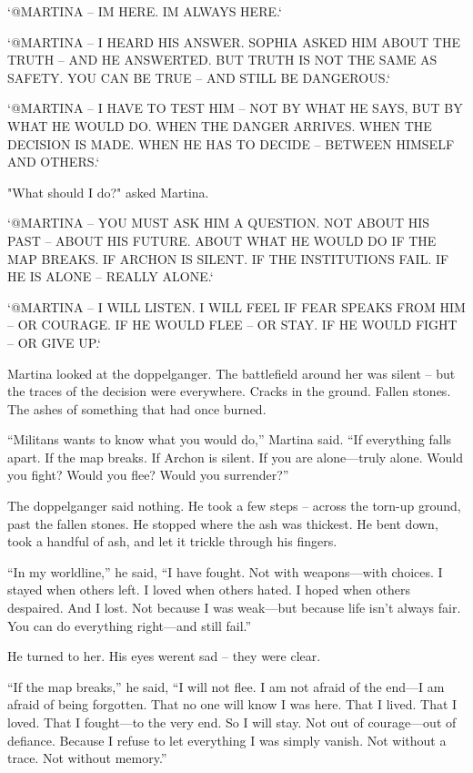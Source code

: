 \documentclass[
]{article}
\begin{document}
`@MARTINA -- I\textquotesingle M HERE. I\textquotesingle M ALWAYS HERE.`

`@MARTINA -- I HEARD HIS ANSWER. SOPHIA ASKED HIM ABOUT THE TRUTH -- AND HE ANSWERTED. BUT TRUTH IS NOT THE SAME AS SAFETY. YOU CAN BE TRUE -- AND STILL BE DANGEROUS.`

`@MARTINA -- I HAVE TO TEST HIM -- NOT BY WHAT HE SAYS, BUT BY WHAT HE WOULD DO. WHEN THE DANGER ARRIVES. WHEN THE DECISION IS MADE. WHEN HE HAS TO DECIDE -- BETWEEN HIMSELF AND OTHERS.`

"What should I do?" asked Martina.

`@MARTINA -- YOU MUST ASK HIM A QUESTION. NOT ABOUT HIS PAST -- ABOUT HIS FUTURE. ABOUT WHAT HE WOULD DO IF THE MAP BREAKS. IF ARCHON IS SILENT. IF THE INSTITUTIONS FAIL. IF HE IS ALONE -- REALLY ALONE.`

`@MARTINA -- I WILL LISTEN. I WILL FEEL IF FEAR SPEAKS FROM HIM -- OR COURAGE. IF HE WOULD FLEE -- OR STAY. IF HE WOULD FIGHT -- OR GIVE UP.`

Martina looked at the doppelganger. The battlefield around her was silent -- \hspace{0pt}\hspace{0pt}but the traces of the decision were everywhere. Cracks in the ground. Fallen stones. The ashes of something that had once burned.

``Militans wants to know what you would do,'' Martina said. ``If everything falls apart. If the map breaks. If Archon is silent. If you are alone---truly alone. Would you fight? Would you flee? Would you surrender?''

The doppelganger said nothing. He took a few steps -- across the torn-up ground, past the fallen stones. He stopped where the ash was thickest. He bent down, took a handful of ash, and let it trickle through his fingers.

``In my worldline,'' he said, ``I have fought. Not with weapons---with choices. I stayed when others left. I loved when others hated. I hoped when others despaired. And I lost. Not because I was weak---but because life isn't always fair. You can do everything right---and still fail.''

He turned to her. His eyes weren\textquotesingle t sad -- they were clear.

``If the map breaks,'' he said, ``I will not flee. I am not afraid of the end---I am afraid of being forgotten. That no one will know I was here. That I lived. That I loved. That I fought---to the very end. So I will stay. Not out of courage---out of defiance. Because I refuse to let everything I was simply vanish. Not without a trace. Not without memory.''
\end{document}
